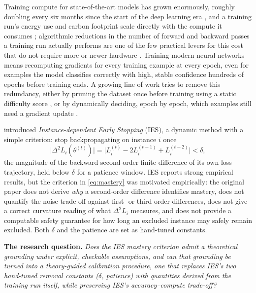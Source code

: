 \documentclass{article}
\theoremstyle{plain}
\theoremstyle{definition}
\theoremstyle{remark}
\begin{document}
Training compute for state-of-the-art models has grown enormously, roughly doubling every six months since the start of the deep learning era \citep{sevilla2022compute}, and a training run's energy use and carbon footprint scale directly with the compute it consumes \citep{patterson2022carbon}; algorithmic reductions in the number of forward and backward passes a training run actually performs are one of the few practical levers for this cost that do not require more or newer hardware \citep{bartoldson2023computeefficient}. Training modern neural networks means recomputing gradients for every training example at every epoch, even for examples the model classifies correctly with high, stable confidence hundreds of epochs before training ends. A growing line of work tries to remove this redundancy, either by pruning the dataset once before training using a static difficulty score \citep{toneva2019empirical,paul2021deep,swayamdipta2020dataset,sorscher2022beyond,zheng2023coverage,maharana2024d2}, or by dynamically deciding, epoch by epoch, which examples still need a gradient update \citep{loshchilov2015online,katharopoulos2018not,jiang2019accelerating,qin2024infobatch,mindermann2022prioritized,bankes2024reducr,nagaraj2025coresets,jin2026orderdp}.

\citet{yuan2025instance} introduced \emph{Instance-dependent Early Stopping} (IES), a dynamic method with a simple criterion: stop backpropagating on instance $i$ once
\begin{equation}
\label{eq:mastery}
\big|\Delta^2 L_i(\theta^{(t)})\big| = \big|L_i^{(t)} - 2L_i^{(t-1)} + L_i^{(t-2)}\big| < \delta,
\end{equation}
the magnitude of the backward second-order finite difference of its own loss trajectory, held below $\delta$ for a patience window. IES reports strong empirical results, but the criterion in \cref{eq:mastery} was motivated empirically: the original paper does not derive \emph{why} a second-order difference identifies mastery, does not quantify the noise trade-off against first- or third-order differences, does not give a correct curvature reading of what $\Delta^2 L_i$ measures, and does not provide a computable safety guarantee for how long an excluded instance may safely remain excluded. Both $\delta$ and the patience are set as hand-tuned constants.

\textbf{The research question.} \emph{Does the IES mastery criterion admit a theoretical grounding under explicit, checkable assumptions, and can that grounding be turned into a theory-guided calibration procedure, one that replaces IES's two hand-tuned removal constants ($\delta$, patience) with quantities derived from the training run itself, while preserving IES's accuracy--compute trade-off?}
\end{document}

